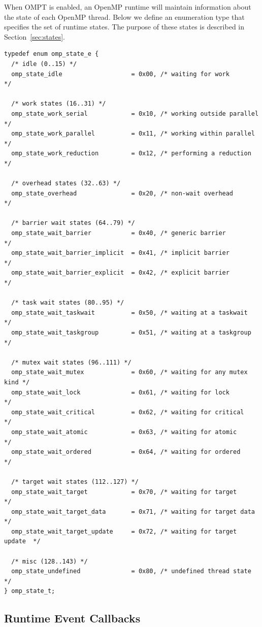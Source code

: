 \documentclass{article}
\begin{document}
When OMPT is enabled, an OpenMP runtime will maintain information about the state of  each OpenMP thread. 
Below we define an enumeration type that specifies the set of runtime states. 
The purpose of these states is described in Section~\ref{sec:states}.

\begin{verbatim}
typedef enum omp_state_e {
  /* idle (0..15) */
  omp_state_idle                   = 0x00, /* waiting for work           */

  /* work states (16..31) */
  omp_state_work_serial            = 0x10, /* working outside parallel   */
  omp_state_work_parallel          = 0x11, /* working within parallel    */
  omp_state_work_reduction         = 0x12, /* performing a reduction     */

  /* overhead states (32..63) */
  omp_state_overhead               = 0x20, /* non-wait overhead          */

  /* barrier wait states (64..79) */
  omp_state_wait_barrier           = 0x40, /* generic barrier            */
  omp_state_wait_barrier_implicit  = 0x41, /* implicit barrier           */
  omp_state_wait_barrier_explicit  = 0x42, /* explicit barrier           */
    
  /* task wait states (80..95) */
  omp_state_wait_taskwait          = 0x50, /* waiting at a taskwait      */
  omp_state_wait_taskgroup         = 0x51, /* waiting at a taskgroup     */
	
  /* mutex wait states (96..111) */	
  omp_state_wait_mutex             = 0x60, /* waiting for any mutex kind */      	    
  omp_state_wait_lock              = 0x61, /* waiting for lock           */
  omp_state_wait_critical          = 0x62, /* waiting for critical       */
  omp_state_wait_atomic            = 0x63, /* waiting for atomic         */
  omp_state_wait_ordered           = 0x64, /* waiting for ordered        */
  
  /* target wait states (112..127) */
  omp_state_wait_target            = 0x70, /* waiting for target         */ 
  omp_state_wait_target_data       = 0x71, /* waiting for target data    */ 
  omp_state_wait_target_update     = 0x72, /* waiting for target update  */ 

  /* misc (128..143) */
  omp_state_undefined              = 0x80, /* undefined thread state     */
} omp_state_t;
\end{verbatim}
\clearpage
\subsection{Runtime Event Callbacks}
\label{appendix:ompt-types:events}
\end{document}
